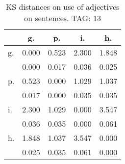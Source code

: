 \begin{table}[h!]
\begin{center}
\begin{tabular}{| l | c | c | c | c |}\hline
 & g. & p. & i. & h. \\\hline
g. & 0.000  & 0.523  & 2.300  & 1.848 \\\hline
 & 0.000  & 0.017  & 0.036  & 0.025 \\\hline
p. & 0.523  & 0.000  & 1.029  & 1.037 \\\hline
 & 0.017  & 0.000  & 0.035  & 0.035 \\\hline
i. & 2.300  & 1.029  & 0.000  & 3.547 \\\hline
 & 0.036  & 0.035  & 0.000  & 0.061 \\\hline
h. & 1.848  & 1.037  & 3.547  & 0.000 \\\hline
 & 0.025  & 0.035  & 0.061  & 0.000 \\\hline
\end{tabular}
\caption{KS distances on use of adjectives on sentences. TAG: 13}
\end{center}
\end{table}